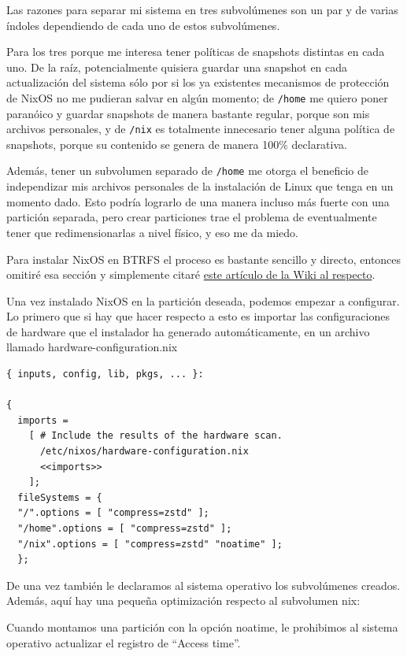 \documentclass[11pt]{article}
\begin{document}
Las razones para separar mi sistema en tres subvolúmenes son un par y de varias índoles dependiendo de cada uno de estos subvolúmenes.

Para los tres porque me interesa tener políticas de snapshots distintas en cada uno. De la raíz, potencialmente quisiera guardar una snapshot en cada actualización del sistema sólo por si los ya existentes mecanismos de protección de NixOS no me pudieran salvar en algún momento; de \texttt{/home} me quiero poner paranóico y guardar snapshots de manera bastante regular, porque son mis archivos personales, y de \texttt{/nix} es totalmente innecesario tener alguna política de snapshots, porque su contenido se genera de manera 100\% declarativa.

Además, tener un subvolumen separado de \texttt{/home} me otorga el beneficio de independizar mis archivos personales de la instalación de Linux que tenga en un momento dado. Esto podría lograrlo de una manera incluso más fuerte con una partición separada, pero crear particiones trae el problema de eventualmente tener que redimensionarlas a nivel físico, y eso me da miedo.

Para instalar NixOS en BTRFS el proceso es bastante sencillo y directo, entonces omitiré esa sección y simplemente citaré \href{https://wiki.nixos.org/wiki/Btrfs}{este artículo de la Wiki al respecto}.

Una vez instalado NixOS en la partición deseada, podemos empezar a configurar. Lo primero que si hay que hacer respecto a esto es importar las configuraciones de hardware que el instalador ha generado automáticamente, en un archivo llamado hardware-configuration.nix

\begin{verbatim}
{ inputs, config, lib, pkgs, ... }:

{
  imports =
    [ # Include the results of the hardware scan.
      /etc/nixos/hardware-configuration.nix
      <<imports>>
    ];
  fileSystems = {
  "/".options = [ "compress=zstd" ];
  "/home".options = [ "compress=zstd" ];
  "/nix".options = [ "compress=zstd" "noatime" ];
  };
\end{verbatim}

De una vez también le declaramos al sistema operativo los subvolúmenes creados. Además, aquí hay una pequeña optimización respecto al subvolumen nix:

Cuando montamos una partición con la opción noatime, le prohibimos al sistema operativo actualizar el registro de ``Access time''.
\end{document}
